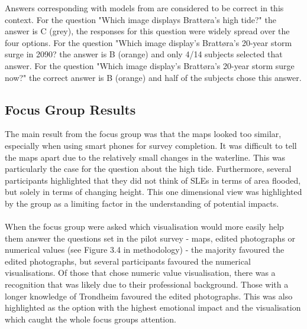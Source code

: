  Answers corresponding with models from \cite{kartverket_se_2020} are considered to be correct in this context.  For the question "Which image displays Brattøra's high tide?" the answer is C (grey), the responses for this question were widely spread over the four options. For the question "Which image display's Brattøra's 20-year storm surge in 2090? the answer is B (orange) and only 4/14 subjects selected that answer. For the question "Which image display's Brattøra's 20-year storm surge now?" the correct answer is B (orange) and half of the subjects chose this answer. 
\paragraph{}


\subsection{Focus Group Results}
  The main result from the focus group  was that the maps looked too similar, especially when using smart phones for survey completion. It was difficult to tell the maps apart due to the relatively small changes in the waterline. This was particularly the case for the question about the high tide. Furthermore, several participants highlighted that they did not think of SLEs in terms of area flooded, but solely in terms of changing height. This one dimensional view was highlighted by the group as a limiting factor in the understanding of potential impacts. 
\paragraph{}

When the focus group were asked  which visualisation would more easily help them answer the questions set in the pilot survey - maps, edited photographs or numerical values (see Figure 3.4 in methodology) - the majority favoured the edited photographs, but several participants favoured the numerical visualisations.
Of those that chose numeric value visualisation, there was a recognition that was likely due to their professional background. Those with a longer knowledge of Trondheim favoured the edited photographs. This was also highlighted as the option with the highest emotional impact and the visualisation which caught the whole focus groups attention.
\paragraph{}

